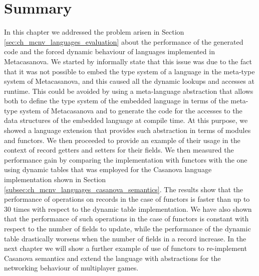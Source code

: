 \section{Summary}
In this chapter we addressed the problem arisen in Section \ref{sec:ch_mcnv_languages_evaluation} about the performance of the generated code and the forced dynamic behaviour of languages implemented in Metacasanova. We started by informally state that this issue was due to the fact that it was not possible to embed the type system of a language in the meta-type system of Metacasanova, and this caused all the dynamic lookups and accesses at runtime. This could be avoided by using a meta-language abstraction that allows both to define the type system of the embedded language in terms of the meta-type system of Metacasanova and to generate the code for the accesses to the data structures of the embedded language at compile time. At this purpose, we showed a language extension that provides such abstraction in terms of modules and functors. We then proceeded to provide an example of their usage in the context of record getters and setters for their fields. We then measured the performance gain by comparing the implementation with functors with the one using dynamic tables that was employed for the Casanova language implementation shown in Section \ref{subsec:ch_mcnv_languages_casanova_semantics}. The results show that the performance of operations on records in the case of functors is faster than up to 30 times with respect to the dynamic table implementation. We have also shown that the performance of such operations in the case of functors is constant with respect to the number of fields to update, while the performance of the dynamic table drastically worsens when the number of fields in a record increase. In the next chapter we will show a further example of use of functors to re-implement Casanova semantics and extend the language with abstractions for the networking behaviour of multiplayer games.
